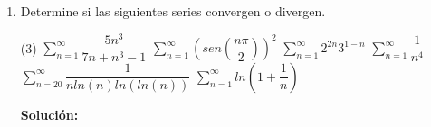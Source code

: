 \documentclass[12pt]{article}
\newenvironment{solucion}
{\begin{mdframed}[backgroundcolor=black!10]
		{\bf Solución:}\\
	}
	{
	\end{mdframed}
}
\newenvironment{preguntas}
{\begin{enumerate}\itemsep12pt
	}
	{
	\end{enumerate}
}
\newcommand{\ev}{\Big|}
\newcommand{\ra}{\rightarrow}
\begin{document}
\begin{preguntas}
\begin{solucion}
		En primer lugar,
		$$\displaystyle\int \dfrac{x}{x^2+1}$$
		Usamos $u = x^2+1 \ra du=2xdx$,
		$$\displaystyle\int \dfrac{x}{x^2+1} = \int\dfrac{du}{2u} = \dfrac{1}{2}ln(u) = \dfrac{1}{2}ln(x^2+1) = ln(\sqrt[]{x^2+1})$$
		En segundo lugar,
		$$\int \dfrac{3}{3x+1}dx$$
		Usamos $u=3x+1 \ra du = 3dx$,
		$$\int \dfrac{3}{3x+1}dx = \int \dfrac{du}{u} = ln(u) = ln(3x+1)$$
		Volviendo al problema original,
		$$I = \lim\limits_{a\ra \infty} (ln(\sqrt[]{x^2+1})-ln(3x+1)) \ev_0^a$$
		$$= \lim\limits_{a\ra \infty} ln \left( \dfrac{\sqrt[]{x^2+1}}{3x+1} \right) \ev_0^a$$
		$$= \lim\limits_{a\ra \infty} ln \left( \dfrac{\sqrt[]{a^2+1}}{3a+1} \right) - ln(1)$$
		$$I = ln\left(\dfrac{1}{3}\right) = -ln(3)$$
\end{solucion}
\item Determine si las siguientes series convergen o divergen.
\begin{tasks}(3)
\task $\sum\limits_{n=1}^{\infty}\dfrac{5n^3}{7n+n^3-1}$
\task $\sum\limits_{n=1}^{\infty}\left(sen\left(\dfrac{n\pi}{2}\right)\right)^2$
\task $\sum\limits_{n=1}^{\infty}2^{2n}3^{1-n}$
\task $\sum\limits_{n=1}^{\infty}\dfrac{1}{n^4}$
\task $\sum\limits_{n=20}^{\infty}\dfrac{1}{nln(n)ln(ln(n))}$
\task $\sum\limits_{n=1}^{\infty}ln\left(1+\dfrac{1}{n}\right)$
\end{tasks}
\begin{solucion}


\end{solucion}
\end{preguntas}
\end{document}
